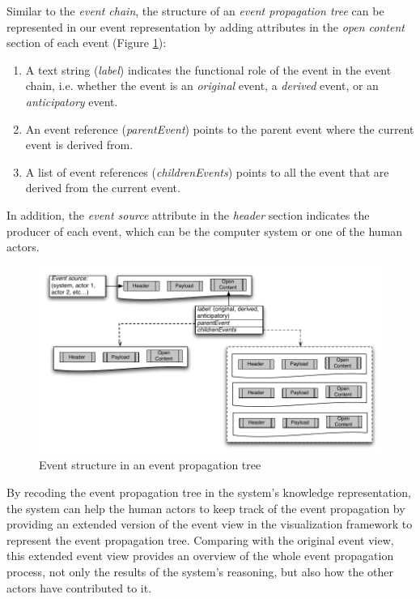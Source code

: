 Similar to the \emph{event chain}, the structure of an \emph{event propagation tree} can be represented in our event representation by adding attributes in the \emph{open content} section of each event (Figure \ref{fig:event_propagation_tree_representation}): 
\begin{enumerate}
 	\item A text string (\emph{label}) indicates the functional role of the event in the event chain, i.e. whether the event is an \emph{original} event, a \emph{derived} event, or an \emph{anticipatory} event.
 	\item An event reference (\emph{parentEvent}) points to the parent event where the current event is derived from. 
 	\item A list of event references (\emph{childrenEvents}) points to all the event that are derived from the current event.
 \end{enumerate} 

In addition, the \emph{event source} attribute in the \emph{header} section indicates the producer of each event, which can be the computer system or one of the human actors.
\begin{figure}[htbp] %
	\centering
	\includegraphics{event_propagation_tree_representation.pdf} 
	\caption{Event structure in an event propagation tree}
	\label{fig:event_propagation_tree_representation}
\end{figure}

By recoding the event propagation tree in the system's knowledge representation, the system can help the human actors to keep track of the event propagation by providing an extended version of the event view in the visualization framework to represent the event propagation tree. Comparing with the original event view, this extended event view provides an overview of the whole event propagation process, not only the results of the system's reasoning, but also how the other actors have contributed to it.

